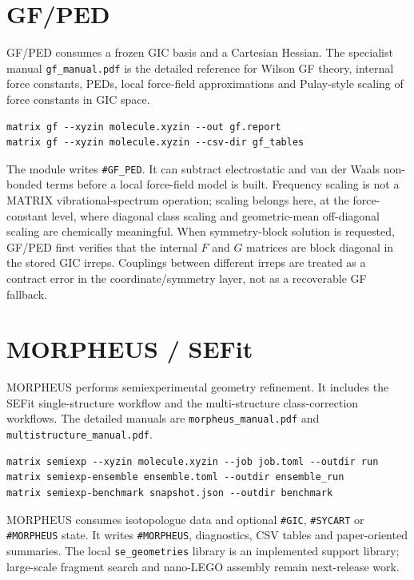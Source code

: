 \documentclass[11pt]{article}
\newcommand{\sectionname}[1]{\texttt{\##1}}
\begin{document}
\section{GF/PED}

GF/PED consumes a frozen GIC basis and a Cartesian Hessian.  The specialist
manual \texttt{gf\_manual.pdf} is the detailed reference for Wilson GF theory,
internal force constants, PEDs, local force-field approximations and
Pulay-style scaling of force constants in GIC space.

\begin{lstlisting}[style=matrix]
matrix gf --xyzin molecule.xyzin --out gf.report
matrix gf --xyzin molecule.xyzin --csv-dir gf_tables
\end{lstlisting}

The module writes \sectionname{GF\_PED}.  It can subtract electrostatic and van
der Waals non-bonded terms before a local force-field model is built.  Frequency
scaling is not a MATRIX vibrational-spectrum operation; scaling belongs here,
at the force-constant level, where diagonal class scaling and geometric-mean
off-diagonal scaling are chemically meaningful.  When symmetry-block solution is
requested, GF/PED first verifies that the internal \(F\) and \(G\) matrices are
block diagonal in the stored GIC irreps.  Couplings between different irreps are
treated as a contract error in the coordinate/symmetry layer, not as a
recoverable GF fallback.

\section{MORPHEUS / SEFit}

MORPHEUS performs semiexperimental geometry refinement.  It includes the SEFit
single-structure workflow and the multi-structure class-correction workflows.
The detailed manuals are \texttt{morpheus\_manual.pdf} and
\texttt{multistructure\_manual.pdf}.

\begin{lstlisting}[style=matrix]
matrix semiexp --xyzin molecule.xyzin --job job.toml --outdir run
matrix semiexp-ensemble ensemble.toml --outdir ensemble_run
matrix semiexp-benchmark snapshot.json --outdir benchmark
\end{lstlisting}

MORPHEUS consumes isotopologue data and optional \sectionname{GIC},
\sectionname{SYCART} or \sectionname{MORPHEUS} state.  It writes
\sectionname{MORPHEUS}, diagnostics, CSV tables and paper-oriented summaries.
The local \texttt{se\_geometries} library is an implemented support library;
large-scale fragment search and nano-LEGO assembly remain next-release work.
\end{document}
